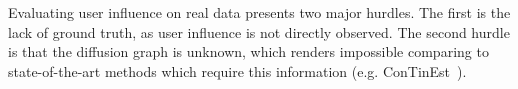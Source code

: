 Evaluating user influence on real data presents two major hurdles.
The first is the lack of ground truth, as user influence is not directly observed.
The second hurdle is that the diffusion graph is unknown, which renders impossible comparing to state-of-the-art methods which require this information (e.g. ConTinEst~\cite{Du2013}).
%
%
